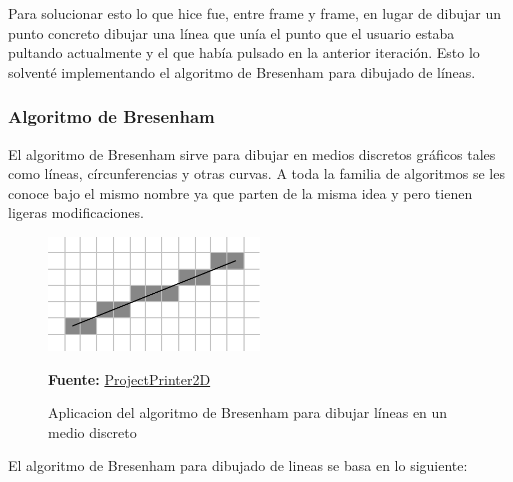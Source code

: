 \vspace{0.5cm}

Para solucionar esto lo que hice fue, entre frame y frame, en lugar de dibujar un punto concreto dibujar una línea que unía el punto que el usuario estaba pultando actualmente y el que había pulsado en la anterior iteración. Esto lo solventé implementando el algoritmo de Bresenham para dibujado de líneas.

\vspace{0.5cm}

\subsubsection{Algoritmo de Bresenham}

\vspace{0.5cm}

El algoritmo de Bresenham sirve para dibujar en medios discretos gráficos tales como líneas, círcunferencias y otras curvas. A toda la familia de algoritmos se les conoce bajo el mismo nombre ya que parten de la misma idea y pero tienen ligeras modificaciones.

\vspace{0.5cm}

\begin{figure}[htbp]
\centering
  \includegraphics[width=0.5\textwidth]{archivos/bresenham.png}
  \caption{Aplicacion del algoritmo de Bresenham para dibujar líneas en un medio discreto}
    \textbf{Fuente:} \href{https://projectprinter2d.wordpress.com/2015/02/12/point-to-point-with-linear-path-bresenhams-algorithm-implementation/#more-105}{ProjectPrinter2D}
  \label{fig:bresenham}
\end{figure}

\vspace{0.5cm}

El algoritmo de Bresenham para dibujado de lineas se basa en lo siguiente:

